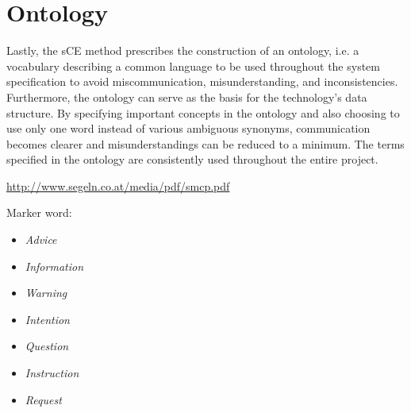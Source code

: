 \section{Ontology}
Lastly, the sCE method prescribes the construction of an ontology, i.e. a vocabulary describing a common language to be used throughout the system specification to avoid miscommunication, misunderstanding, and inconsistencies. Furthermore, the ontology can serve as the basis for the technology’s data structure. By specifying important concepts in the ontology and also choosing to use only one word instead of various ambiguous synonyms, communication becomes clearer and misunderstandings can be reduced to a minimum. The terms specified in the ontology are consistently used throughout the entire project.

\url{http://www.segeln.co.at/media/pdf/smcp.pdf}

Marker word: 
\begin{itemize}
	\item \emph{Advice}
	\item \emph{Information}
	\item \emph{Warning}
	\item \emph{Intention}
	\item \emph{Question}
	\item \emph{Instruction}
	\item \emph{Request}
\end{itemize}

